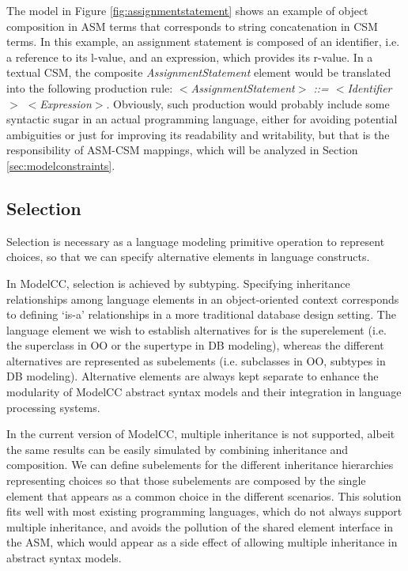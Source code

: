 \documentclass[preprint]{elsarticle}
\newcommand{\etexttt}[1]{\textit{#1}}
\begin{document}
The model in Figure \ref{fig:assignmentstatement} shows an example of object composition in ASM terms that corresponds to string concatenation in CSM terms.
In this example, an assignment statement is composed of an identifier, i.e. a reference to its l-value, and an expression, which provides its r-value.
In a textual CSM, the composite \emph{AssignmentStatement} element would be translated into the following production rule: \etexttt{$<$AssignmentStatement$>$ ::= $<$Identifier$>$ $<$Expression$>$}.
Obviously, such production would probably include some syntactic sugar in an actual programming language, either for avoiding potential ambiguities or just for improving its readability and writability, but that is the responsibility of ASM-CSM mappings, which will be analyzed in Section \ref{sec:modelconstraints}.

\subsection{Selection}

Selection is necessary as a language modeling primitive operation to represent choices, so that we can specify alternative elements in language constructs.

In ModelCC, selection is achieved by subtyping.
Specifying inheritance relationships among language elements in an object-oriented context corresponds to defining `is-a' relationships in a more traditional database design setting.
The language element we wish to establish alternatives for is the superelement (i.e. the superclass in OO or the supertype in DB modeling), whereas the different alternatives are represented as subelements (i.e. subclasses in OO, subtypes in DB modeling).
Alternative elements are always kept separate to enhance the modularity of ModelCC abstract syntax models and their integration in language processing systems.

In the current version of ModelCC, multiple inheritance is not supported, albeit the same results can be easily simulated by combining inheritance and composition.
We can define subelements for the different inheritance hierarchies representing choices so that those subelements are composed by the single element that appears as a common choice in the different scenarios.
This solution fits well with most existing programming languages, which do not always support multiple inheritance, and avoids the pollution of the shared element interface in the ASM, which would appear as a side effect of allowing multiple inheritance in abstract syntax models.
\end{document}
